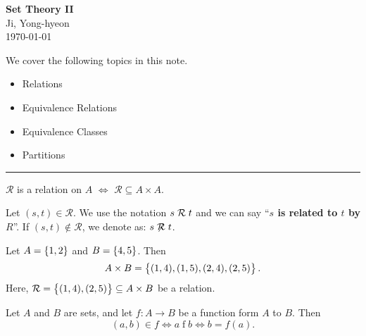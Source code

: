 \documentclass[11pt,openany]{article}
\begin{document}
\begin{center}
	\huge\textbf{Set Theory II}\\
	\vspace{0.5em}
	\large{Ji, Yong-hyeon}\\
	\vspace{0.5em}
	\normalsize{\today}\\
\end{center}

\noindent We cover the following topics in this note.
\begin{itemize}
	\item Relations
	\item Equivalence Relations
	\item Equivalence Classes
	\item Partitions
\end{itemize}
\hrule\vspace{12pt}
\begin{remark*}
	$\mathcal{R}$ is a relation on $A$ $\iff$ $\mathcal{R}\subseteq A\times A$.
\end{remark*}
\begin{note}[Notation]
	Let $(s,t)\in\mathcal{R}$. We use the notation $s\mathrel{\mathcal{R}} t$ and we can say ``\textbf{$s$ is related to $t$ by $R$}''. If $(s,t)\notin\mathcal{R}$, we denote as: $s\centernot\relation t$.
\end{note}
\vfill
\begin{example*}
	Let $A=\set{1,2}$ and $B=\set{4,5}$. Then \[
	A\times B=\set{(1,4),(1,5),(2,4),(2,5)}.
	\] Here, $\mathcal{R}=\set{(1,4),(2,5)}\subseteq A\times B$ be a relation.
	\begin{center}
	
	\end{center}
\end{example*}

\begin{example*}
	Let $A$ and $B$ are sets, and let $f:A\to B$ be a function form $A$ to $B$. Then \[
	(a,b)\in f\iff a\mathrel{f}b\iff b=f(a).
	\]
\end{example*}
\end{document}

